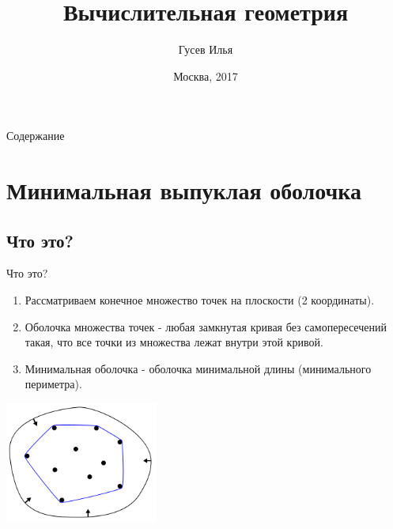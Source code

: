 \documentclass[10pt]{beamer}
\title[\href{https://goo.gl/NRgp8K}{https://goo.gl/NRgp8K} (Term 3)]{Вычислительная геометрия}
\author[Гусев Илья]{Гусев Илья}
\institute[МФТИ] 
{Московский физико-технический институт\\*}
\date{Москва, 2017}
\begin{document}
\begin{frame}
  \titlepage
\end{frame}

\begin{frame}{Содержание}
\tableofcontents
\end{frame}

\section{Минимальная выпуклая оболочка}

\subsection{Что это?}
\begin{frame}[fragile]{Что это?}
\begin{enumerate}
\item Рассматриваем конечное множество точек на плоскости (2 координаты).
\item Оболочка множества точек - любая замкнутая кривая без самопересечений такая, что все точки из множества лежат внутри этой кривой.
\item Минимальная оболочка - оболочка минимальной длины (минимального периметра).
\end{enumerate}
\begin{center}
\includegraphics[width=5cm, height=4cm]{Term_3/Source/Pictures//convex1.png}
\end{center}
\end{frame}
\end{document}

